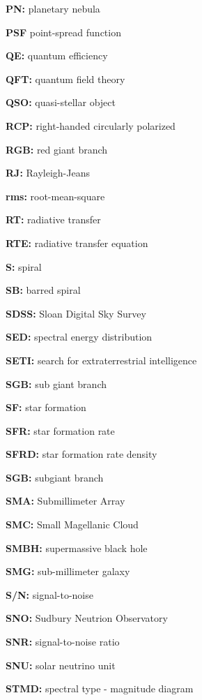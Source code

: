 \documentclass[a4paper,10pt]{article}
\begin{document}
{\noindent}\textbf{PN:} planetary nebula

{\noindent}\textbf{PSF} point-spread function

{\noindent}\textbf{QE:} quantum efficiency

{\noindent}\textbf{QFT:} quantum field theory

{\noindent}\textbf{QSO:} quasi-stellar object

{\noindent}\textbf{RCP:} right-handed circularly polarized

{\noindent}\textbf{RGB:} red giant branch

{\noindent}\textbf{RJ:} Rayleigh-Jeans

{\noindent}\textbf{rms:} root-mean-square

{\noindent}\textbf{RT:} radiative transfer

{\noindent}\textbf{RTE:} radiative transfer equation

{\noindent}\textbf{S:} spiral

{\noindent}\textbf{SB:} barred spiral

{\noindent}\textbf{SDSS:} Sloan Digital Sky Survey

{\noindent}\textbf{SED:} spectral energy distribution

{\noindent}\textbf{SETI:} search for extraterrestrial intelligence

{\noindent}\textbf{SGB:} sub giant branch

{\noindent}\textbf{SF:} star formation

{\noindent}\textbf{SFR:} star formation rate

{\noindent}\textbf{SFRD:} star formation rate density

{\noindent}\textbf{SGB:} subgiant branch

{\noindent}\textbf{SMA:} Submillimeter Array

{\noindent}\textbf{SMC:} Small Magellanic Cloud

{\noindent}\textbf{SMBH:} supermassive black hole

{\noindent}\textbf{SMG:} sub-millimeter galaxy

{\noindent}\textbf{S/N:} signal-to-noise

{\noindent}\textbf{SNO:} Sudbury Neutrion Observatory

{\noindent}\textbf{SNR:} signal-to-noise ratio

{\noindent}\textbf{SNU:} solar neutrino unit

{\noindent}\textbf{STMD:} spectral type - magnitude diagram
\end{document}
